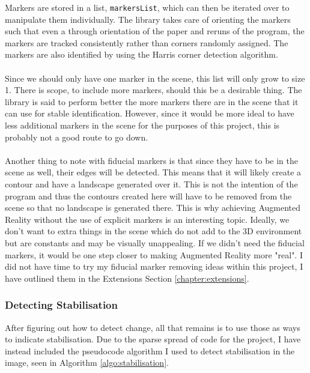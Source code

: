 \documentclass[11pt]{article}
\begin{document}
Markers are stored in a list, \texttt{markersList}, which can then be 
iterated over to manipulate them individually. The library takes care
of orienting the markers such that even a through orientation of the
paper and reruns of the program, the markers are tracked consistently 
rather than corners randomly assigned. The markers are also identified
by using the Harris corner detection algorithm.\\
\\
Since we should only have one marker in the scene, this list will 
only grow to size 1. There is scope, to include more markers,
should this be a desirable thing. The library is said to perform
better the more markers there are in the scene that it can use for
stable identification. However, since it would be more ideal to have 
less additional markers in the scene for the purposes of this
project, this is probably not a good route
to go down.\\
\\
Another thing to note with fiducial markers is that since they have to be
in the scene as well, their edges will be detected. This means that it
will likely create a contour and have a landscape generated over it. This is
not the intention of the program and thus the contours created here will
have to be removed from the scene so that no landscape is generated there.
This is why achieving Augmented Reality without the use of explicit 
markers is an interesting topic. Ideally, we don't want to extra things 
in the scene which do not add to the 3D environment but are constants and
may be visually unappealing. If we didn't need the fiducial markers, it would
be one step closer to making Augmented Reality more "real". I did not
have time to try my fiducial marker removing ideas within this project,
I have outlined them in the Extensions Section \ref{chapter:extensions}.

\subsubsection{Detecting Stabilisation}
After figuring out how to detect change, all that remains is to use those
as ways to indicate stabilisation. Due to the sparse spread of code
for the project, I have instead included the pseudocode algorithm I 
used to detect stabilisation in the image, seen in 
Algorithm \ref{algo:stabilisation}. 
\end{document}
